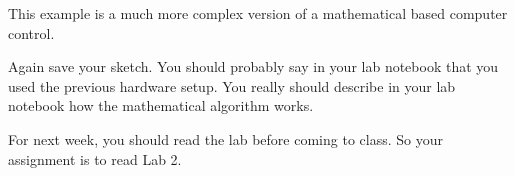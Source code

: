 This example is a much more complex version of a mathematical based computer
control.



Again save your sketch. You should probably say in your lab notebook that
you used the previous hardware setup. You really should describe in your lab
notebook how the mathematical algorithm works.

For next week, you should read the lab before coming to class. So your
assignment is to read Lab 2.

\vspace*{\fill}
\pagebreak
